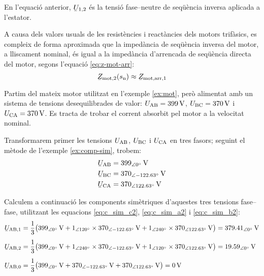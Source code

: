En l'equació anterior, $\cmplx{U}_{1,2}$ és la tensió  fase--neutre de seqüència inversa aplicada a l’estator.

A causa dels valors usuals de les resistències i reactàncies dels motors trifàsics, es compleix de forma aproximada que la impedància de seqüència inversa del motor, a lliscament nominal,  és igual a la impedància d'arrencada de seqüència directa del motor, segons l'equació \eqref{eq:z-mot-arr}:
\begin{equation}
	\cmplx{Z}\ped{mot,2}(s\ped{n}) \approx \cmplx{Z}\ped{mot,arr,1}\label{eq:Zarr-aprox-Z2}
\end{equation}


\begin{exemple}\label{ex:mot-tens-deseq}
	Partim del mateix motor utilitzat en l'exemple \vref{ex:mot}, però alimentat amb un sistema de tensions desequilibrades de valor: $U_\mathrm{AB} =
	\SI{399}{V}$, $U_\mathrm{BC} = \SI{370}{V}$ i
	$U_\mathrm{CA} = \SI{370}{V}$. Es tracta de trobar el corrent absorbit pel motor a la velocitat nominal.
	
	Transformarem primer les tensions $U_\mathrm{AB}$, $U_\mathrm{BC}$ i $U_\mathrm{CA}$ en tres fasors; seguint el mètode de l'exemple \vref{ex:comp-sim}, trobem:
	\begin{align*}
		\cmplx{U}\ped{AB} &= \SIpd{399}{0}{V} \\
		\cmplx{U}\ped{BC} &= \SIpd{370}{-122,63}{V} \\
		\cmplx{U}\ped{CA} &= \SIpd{370}{122,63}{V}
	\end{align*}
	
	Calculem a continuació les components simètriques d'aquestes tres tensions fase--fase, utilitzant les equacions
	\eqref{eq:c_sim_c2}, \eqref{eq:c_sim_a2} i \eqref{eq:c_sim_b2}:
	\begin{align*}
	\cmplx{U}\ped{AB,1} &= \frac{1}{3} \big(
	\SIpd{399}{0}{V} + \numpd{1}{120} \times \SIpd{370}{-122,63}{V} +
	\numpd{1}{240} \times \SIpd{370}{122,63}{V}\big) = \SIpd{379,41}{0}{V} \\[1ex]
	\cmplx{U}\ped{AB,2} &= \frac{1}{3} \big(
	\SIpd{399}{0}{V} + \numpd{1}{240} \times \SIpd{370}{-122,63}{V} +
	\numpd{1}{120} \times \SIpd{370}{122,63}{V} \big) = \SIpd{19,59}{0}{V} \\[1ex]
	\cmplx{U}\ped{AB,0} &= \frac{1}{3} \big(
	\SIpd{399}{0}{V} + \SIpd{370}{-122,63}{V} + \SIpd{370}{122,63}{V}\big) = \SI{0}{V}
	\end{align*}
	

\end{exemple}
